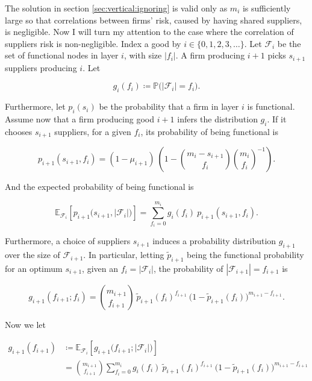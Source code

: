 \documentclass[american, abstract=on]{scrartcl}
\newcommand{\F}{\mathcal{F}}
\renewcommand{\P}{\mathbb{P}}
\newcommand{\E}{\mathbb{E}}
\newcommand{\abs}[1]{\left\lvert#1\right\rvert}
\begin{document}
The solution in section \ref{sec:vertical:ignoring} is valid only as $m_i$ is sufficiently large so that correlations between firms' risk, caused by having shared suppliers, is negligible. Now I will turn my attention to the case where the correlation of suppliers risk is non-negligible. Index a good by $i \in \{0, 1, 2, 3, \ldots\}$. Let $\F_i$ be the set of functional nodes in layer $i$, with size $\abs{f_i}$. A firm producing $i + 1$ picks $s_{i + 1}$ suppliers producing $i$. Let 

\begin{equation}
  g_i(f_i) \coloneqq \P\Big( \abs{\F_i} = f_i \Big).
\end{equation}

Furthermore, let $p_i(s_i)$ be the probability that a firm in layer $i$ is functional. Assume now that a firm producing good $i + 1$ infers the distribution $g_i$. If it chooses $s_{i+1}$ suppliers, for a given $f_i$, its probability of being functional is

\begin{equation}
  p_{i+1}(s_{i+1}, f_i) = (1 - \mu_{i+1}) \ \left(1 - \binom{m_i - s_{i+1}}{f_i} \binom{m_i}{f_i}^{-1} \right).
\end{equation}

And the expected probability of being functional is

\begin{equation}
  \E_{\F_i} \left[ p_{i+1}\Big(s_{i+1}, \abs{\F_i} \Big)\right] = \sum^{m_i}_{f_i = 0} g_i(f_i) \  p_{i+1}(s_{i+1}, f_i).
\end{equation}

Furthermore, a choice of suppliers $s_{i + 1}$ induces a probability distribution $g_{i+1}$ over the size of $\F_{i+1}$. In particular, letting $\tilde{p}_{i+1}$ being the functional probability for an optimum $s_{i+1}$, given an $f_i = \abs{\F_i}$, the probability of $\abs{\F_{i+1}} = f_{i+1}$ is 

\begin{equation}
  g_{i+1}(f_{i+1}; f_i) = \binom{m_{i+1}}{f_{i+1}} \ \tilde{p}_{i+1}(f_i)^{f_{i+1}} \ \Big(1 - \tilde{p}_{i+1}(f_i)\Big)^{m_{i+1} - f_{i+1}}.
\end{equation}

Now we let

\begin{equation}
  \begin{split}
    g_{i+1}(f_{i+1}) &\coloneqq \E_{\F_i} \left[ g_{i+1}\Big(f_{i+1}; \abs{\F_i} \Big)\right] \\
    &= \binom{m_{i+1}}{f_{i+1}} \sum^{m_i}_{f_i = 0} g_i(f_i) \ \tilde{p}_{i+1}(f_i)^{f_{i+1}} \ \Big(1 - \tilde{p}_{i+1}(f_i)\Big)^{m_{i+1} - f_{i+1}}
  \end{split}
\end{equation}
\end{document}
